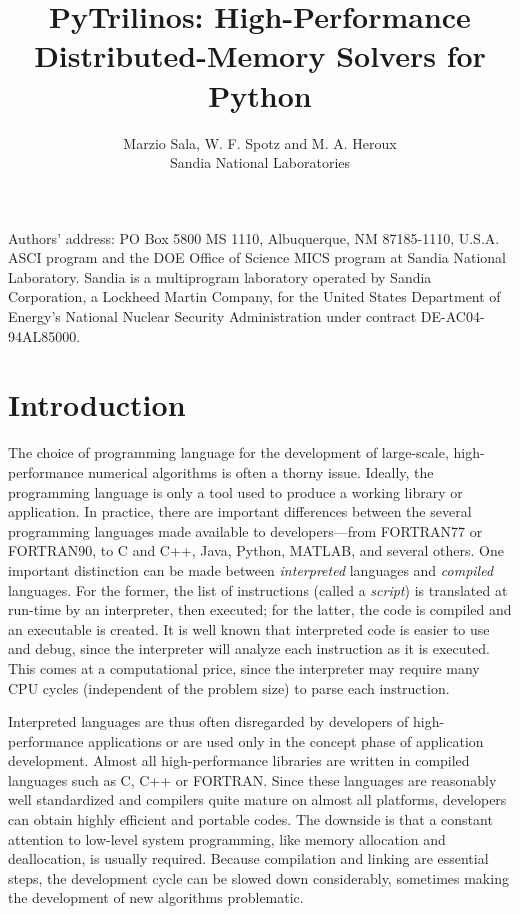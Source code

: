 \documentclass[acmtocl]{acmtrans2m}
\title{PyTrilinos: High-Performance Distributed-Memory Solvers for
       Python}
\author{Marzio Sala, W. F. Spotz and M. A. Heroux \\
        Sandia National Laboratories}
\begin{document}
\setcounter{page}{1}

\begin{bottomstuff}
Authors' address: PO Box 5800 MS 1110, Albuquerque, NM 87185-1110,
U.S.A.\newline
ASCI program and the DOE Office of Science MICS program at Sandia
National Laboratory.  Sandia is a multiprogram laboratory operated by
Sandia Corporation, a Lockheed Martin Company, for the United States
Department of Energy's National Nuclear Security Administration under
contract DE-AC04-94AL85000.
\end{bottomstuff}

\maketitle

\section{Introduction}
\label{sec:intro}

The choice of programming language for the development of large-scale,
high-performance numerical algorithms is often a thorny issue.
Ideally, the programming language is only a tool used to produce a
working library or application.  In practice, there are important
differences between the several programming languages made available
to developers---from FORTRAN77 or FORTRAN90, to C and C++, Java,
Python, MATLAB, and several others.  One important distinction can be
made between {\sl interpreted} languages and {\sl compiled} languages.
For the former, the list of instructions (called a {\sl script}) is
translated at run-time by an interpreter, then executed; for the
latter, the code is compiled and an executable is created.  It is well
known that interpreted code is easier to use and debug, since the
interpreter will analyze each instruction as it is executed.  This
comes at a computational price, since the interpreter may require many
CPU cycles (independent of the problem size) to parse each
instruction.

Interpreted languages are thus often disregarded by developers of
high-performance applications or are used only in the concept phase of
application development.  Almost all high-performance libraries are
written in compiled languages such as C, C++ or FORTRAN.  Since these
languages are reasonably well standardized and compilers quite mature
on almost all platforms, developers can obtain highly efficient and
portable codes.  The downside is that a constant attention to
low-level system programming, like memory allocation and deallocation,
is usually required.  Because compilation and linking are essential
steps, the development cycle can be slowed down considerably,
sometimes making the development of new algorithms problematic.
\end{document}
